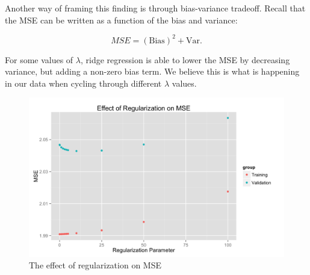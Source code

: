 \documentclass[fleqn,12pt]{SelfArx} %
\begin{document}
Another way of framing this finding is through bias-variance tradeoff. Recall that the MSE can be written as a function of the bias and variance:

\begin{equation}
MSE = (\textrm{Bias})^2 + \textrm{Var}.
\end{equation}

\noindent For some values of $\lambda$, ridge regression is able to lower the MSE by decreasing variance, but adding a non-zero bias term. We believe this is what is happening in our data when cycling through different $\lambda$ values.

\begin{figure}[ht]\centering
\includegraphics[width=\linewidth]{mse_plot.png}
\caption{The effect of regularization on MSE}
\label{fig:mse_plot}
\end{figure}
\end{document}
